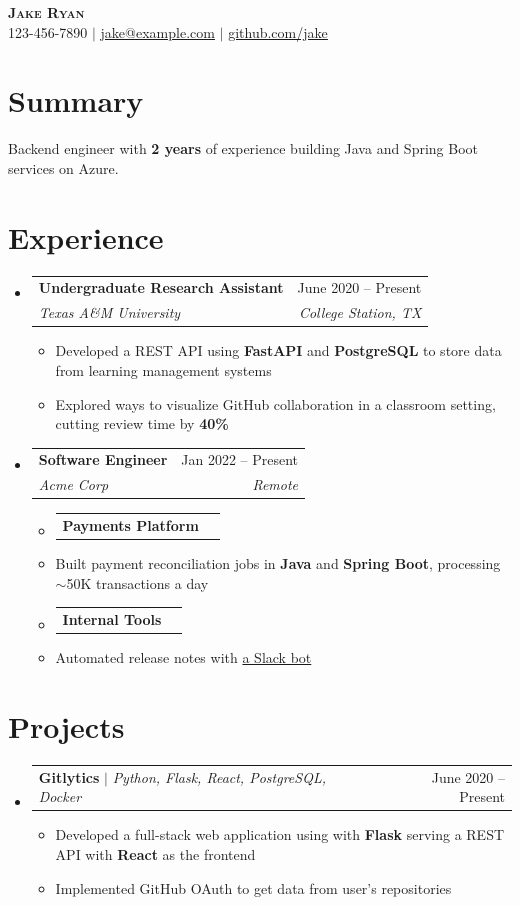 \documentclass[letterpaper,11pt]{article}
\makeatletter
\newcommand{\resumeItem}[1]{
  \item\small{
    {#1 \vspace{-2pt}}
  }
}
\newcommand{\resumeSubheading}[4]{
  \vspace{-2pt}\item
    \begin{tabular*}{0.97\textwidth}[t]{l@{\extracolsep{\fill}}r}
      \textbf{#1} & #2 \\
      \textit{\small#3} & \textit{\small #4} \\
    \end{tabular*}\vspace{-7pt}
}
\newcommand{\resumeProjectHeading}[2]{
    \item
    \begin{tabular*}{0.97\textwidth}{l@{\extracolsep{\fill}}r}
      \small#1 & #2 \\
    \end{tabular*}\vspace{-7pt}
}
\newcommand{\resumeSubHeadingListStart}{\begin{itemize}[leftmargin=0.15in, label={}]}
\newcommand{\resumeSubHeadingListEnd}{\end{itemize}}
\newcommand{\resumeItemListStart}{\begin{itemize}}
\newcommand{\resumeItemListEnd}{\end{itemize}\vspace{-5pt}}
\makeatother
\begin{document}
\begin{center}
    \textbf{\Huge \scshape Jake Ryan} \\ \vspace{1pt}
    \small 123-456-7890 $|$ \href{mailto:jake@example.com}{\underline{jake@example.com}} $|$
    \href{https://github.com/jake}{\underline{github.com/jake}}
\end{center}

\section{Summary}
\small{Backend engineer with \textbf{2 years} of experience building Java and Spring Boot services on Azure.}

\section{Experience}
  \resumeSubHeadingListStart

    \resumeSubheading
      {Undergraduate Research Assistant}{June 2020 -- Present}
      {Texas A\&M University}{College Station, TX}
      \resumeItemListStart
        \resumeItem{Developed a REST API using \textbf{FastAPI} and \textbf{PostgreSQL} to store data from learning management systems}
        \resumeItem{Explored ways to visualize GitHub collaboration in a classroom setting, cutting review time by \textbf{40\%}}
      \resumeItemListEnd

    \resumeSubheading
      {Software Engineer}{Jan 2022 -- Present}
      {Acme Corp}{Remote}
      \resumeItemListStart
        \resumeProjectHeading{\textbf{Payments Platform}}{}
        \resumeItem{Built payment reconciliation jobs in \textbf{Java} and \textbf{Spring Boot}, processing $\sim$50K transactions a day}
        \resumeProjectHeading{\textbf{Internal Tools}}{}
        \resumeItem{Automated release notes with \href{https://example.com}{a Slack bot}}
      \resumeItemListEnd

  \resumeSubHeadingListEnd

\section{Projects}
    \resumeSubHeadingListStart
      \resumeProjectHeading
          {\textbf{Gitlytics} $|$ \emph{Python, Flask, React, PostgreSQL, Docker}}{June 2020 -- Present}
          \resumeItemListStart
            \resumeItem{Developed a full-stack web application using with \textbf{Flask} serving a REST API with \textbf{React} as the frontend}
            \resumeItem{Implemented GitHub OAuth to get data from user's repositories}
          \resumeItemListEnd
    \resumeSubHeadingListEnd
\end{document}
